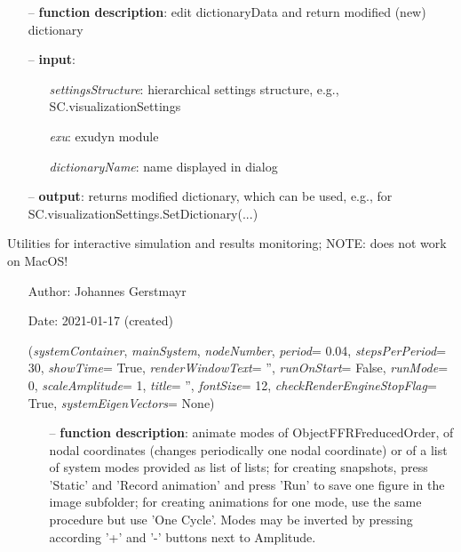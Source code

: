 \begin{itemize}[leftmargin=1.4cm]
\begin{itemize}[leftmargin=1.4cm]
\begin{itemize}[leftmargin=1.4cm]
\begin{itemize}[leftmargin=0.5cm]
\begin{itemize}[leftmargin=1.4cm]
\begin{itemize}[leftmargin=1.4cm]
\begin{itemize}[leftmargin=0.5cm]
\begin{itemize}[leftmargin=1.4cm]
\begin{itemize}[leftmargin=1.4cm]
\begin{itemize}[leftmargin=0.5cm]
\begin{itemize}[leftmargin=1.4cm]
\begin{itemize}[leftmargin=0.7cm]
\item[--]
{\bf function description}: edit dictionaryData and return modified (new) dictionary
\item[--]
{\bf input}: \vspace{-6pt}
\begin{itemize}[leftmargin=1.2cm]
\setlength{\itemindent}{-0.7cm}
\item[]{\it settingsStructure}: hierarchical settings structure, e.g., SC.visualizationSettings
\item[]{\it exu}: exudyn module
\item[]{\it dictionaryName}: name displayed in dialog
\end{itemize}
\item[--]
{\bf output}: returns modified dictionary, which can be used, e.g., for SC.visualizationSettings.SetDictionary(...)
\vspace{12pt}\end{itemize}
%
\label{sec:module:interactive}
  Utilities for interactive simulation and results monitoring; NOTE: does not work on MacOS!
\begin{itemize}[leftmargin=1.4cm]
\setlength{\itemindent}{-1.4cm}
\item[]Author:    Johannes Gerstmayr
\item[]Date:      2021-01-17 (created)
\ei
\begin{flushleft}
\label{sec:interactive:AnimateModes}
({\it systemContainer}, {\it mainSystem}, {\it nodeNumber}, {\it period}= 0.04, {\it stepsPerPeriod}= 30, {\it showTime}= True, {\it renderWindowText}= '', {\it runOnStart}= False, {\it runMode}= 0, {\it scaleAmplitude}= 1, {\it title}= '', {\it fontSize}= 12, {\it checkRenderEngineStopFlag}= True, {\it systemEigenVectors}= None)
\end{flushleft}
\setlength{\itemindent}{0.7cm}
\begin{itemize}[leftmargin=0.7cm]
\item[--]
{\bf function description}: animate modes of ObjectFFRFreducedOrder, of nodal coordinates (changes periodically one nodal coordinate) or of a list of system modes provided as list of lists; for creating snapshots, press 'Static' and 'Record animation' and press 'Run' to save one figure in the image subfolder; for creating animations for one mode, use the same procedure but use 'One Cycle'. Modes may be inverted by pressing according '+' and '-' buttons next to Amplitude.

\end{itemize}
\end{itemize}
\end{itemize}
\end{itemize}
\end{itemize}
\end{itemize}
\end{itemize}
\end{itemize}
\end{itemize}
\end{itemize}
\end{itemize}
\end{itemize}
\end{itemize}
